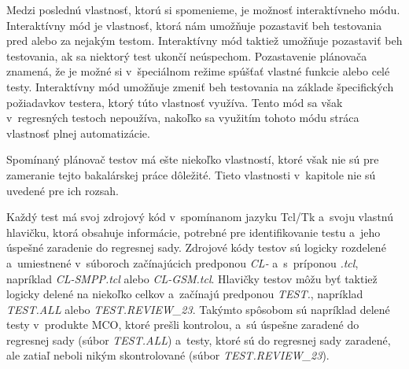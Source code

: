 Medzi poslednú vlastnosť, ktorú si spomenieme, je možnosť interaktívneho módu.
Interaktívny mód je vlastnosť, ktorá nám umožňuje pozastaviť beh 
testovania pred alebo za nejakým testom.
Interaktívny mód taktiež umožňuje pozastaviť beh testovania, ak sa niektorý test 
ukončí neúspechom. Pozastavenie plánovača znamená, že je možné si 
v~špeciálnom režime spúšťať vlastné funkcie alebo celé testy.
Interaktívny mód umožňuje zmeniť beh testovania na základe špecifických 
požiadavkov testera, ktorý túto vlastnosť využíva.
Tento mód sa však v~regresných testoch nepoužíva, nakoľko sa využitím 
tohoto módu stráca vlastnosť plnej automatizácie.

Spomínaný plánovač testov má ešte niekoľko vlastností, ktoré však nie sú
pre zameranie tejto bakalárskej práce dôležité. Tieto vlastnosti
v~kapitole nie sú uvedené pre ich rozsah. 

Každý test má svoj zdrojový kód v~spomínanom jazyku Tcl/Tk a~svoju 
vlastnú hlavičku, ktorá obsahuje informácie, potrebné pre identifikovanie 
testu a~jeho úspešné zaradenie do regresnej sady.
Zdrojové kódy testov sú logicky rozdelené a~umiestnené v~súboroch 
začínajúcich predponou \emph{CL-} a~s~príponou \emph{.tcl}, 
napríklad \emph{CL-SMPP.tcl} alebo \emph{CL-GSM.tcl}.
Hlavičky testov môžu byť taktiež logicky delené na niekoľko celkov 
a~začínajú predponou \emph{TEST.}, napríklad \emph{TEST.ALL} alebo 
\emph{TEST.REVIEW\_23}.
Takýmto spôsobom sú napríklad delené testy v~produkte MCO, ktoré prešli kontrolou,
a~sú úspešne zaradené do regresnej sady (súbor \emph{TEST.ALL}) a~testy, 
ktoré sú do regresnej sady zaradené, ale zatiaľ neboli nikým 
skontrolované (súbor \emph{TEST.REVIEW\_23}).

